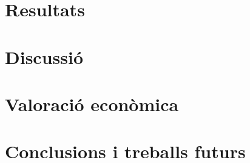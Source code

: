 \documentclass[CAT,BIB]{TFUOC}%
\begin{document}
\chapter{Resultats}

\chapter{Discussió}

\chapter{Valoració econòmica}

\chapter{Conclusions i treballs futurs}
\end{document}
